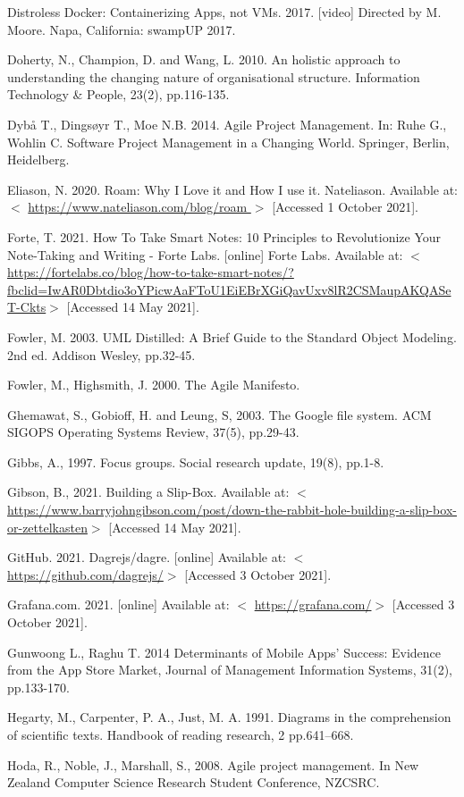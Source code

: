 \documentclass{article}
\begin{document}
{Distroless Docker: Containerizing Apps, not VMs. 2017. [video] Directed by M. Moore. Napa, California: swampUP 2017.

Doherty, N., Champion, D. and Wang, L. 2010. An holistic approach to understanding the changing nature of organisational structure. Information Technology & People, 23(2), pp.116-135.

Dybå T., Dingsøyr T., Moe N.B. 2014. Agile Project Management. In: Ruhe G., Wohlin C. Software Project Management in a Changing World. Springer, Berlin, Heidelberg.

Eliason, N. 2020. Roam: Why I Love it and How I use it. Nateliason. Available at: $<$ \url{https://www.nateliason.com/blog/roam }$>$ [Accessed 1 October 2021].

Forte, T. 2021. How To Take Smart Notes: 10 Principles to Revolutionize Your Note-Taking and Writing - Forte Labs. [online] Forte Labs. Available at: $<$ \url{https://fortelabs.co/blog/how-to-take-smart-notes/?fbclid=IwAR0Dbtdio3oYPicwAaFToU1EiEBrXGiQavUxv8lR2CSMaupAKQASeT-Ckts}$>$ [Accessed 14 May 2021].

Fowler, M. 2003. UML Distilled: A Brief Guide to the Standard Object Modeling. 2nd ed. Addison Wesley, pp.32-45.

Fowler, M.,  Highsmith, J. 2000. The Agile Manifesto.

Ghemawat, S., Gobioff, H. and Leung, S, 2003. The Google file system. ACM SIGOPS Operating Systems Review, 37(5), pp.29-43.

Gibbs, A., 1997. Focus groups. Social research update, 19(8), pp.1-8.

Gibson, B., 2021. Building a Slip-Box. Available at: $<$ \url{https://www.barryjohngibson.com/post/down-the-rabbit-hole-building-a-slip-box-or-zettelkasten}$>$ [Accessed 14 May 2021].

GitHub. 2021. Dagrejs/dagre. [online] Available at: $<$ \url{https://github.com/dagrejs/}$>$ [Accessed 3 October 2021].

Grafana.com. 2021. [online] Available at: $<$ \url{https://grafana.com/}$>$ [Accessed 3 October 2021].

Gunwoong L., Raghu T. 2014 Determinants of Mobile Apps' Success: Evidence from the App Store Market, Journal of Management Information Systems, 31(2), pp.133-170.

Hegarty, M., Carpenter, P. A., Just, M. A. 1991. Diagrams in the comprehension of scientific texts. Handbook of reading research, 2 pp.641–668.

Hoda, R., Noble, J., Marshall, S., 2008. Agile project management. In New Zealand Computer Science Research Student Conference, NZCSRC.

}
\end{document}
